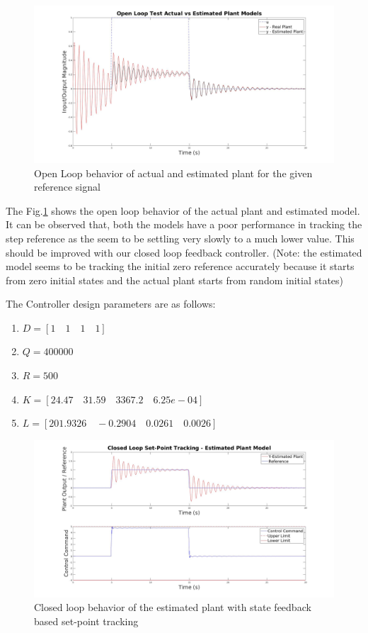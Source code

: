 \documentclass[11pt,usenames]{article}
\begin{document}
\begin{figure}[htpb]
	\centering
	\includegraphics[width=0.85\columnwidth]{OpenLoop_PlantTF.jpg}
	\caption{Open Loop behavior of actual and estimated plant for the given reference signal}
	\label{fig:OpenLoop_PlantTF}
\end{figure}

The Fig.\ref{fig:OpenLoop_PlantTF} shows the open loop behavior of the actual plant and estimated model. It can be observed that, both the models have a poor performance in tracking the step reference as the seem to be settling very slowly to a much lower value. This should be improved with our closed loop feedback controller. (Note: the estimated model seems to be tracking the initial zero reference accurately because it starts from zero initial states and the actual plant starts from random initial states)



The Controller design parameters are as follows:

\begin{enumerate}
	\item $D = \left[ 1 \quad1\quad 1\quad 1\right] $
	\item $Q = 400000$
	\item $R = 500$
	\item $K = \left[24.47 \quad31.59 \quad3367.2 \quad6.25e-04\right]$	
	\item $L = \left[201.9326 \quad-0.2904 \quad0.0261 \quad0.0026\right] $
\end{enumerate}

\begin{figure}[htpb]
	\centering
	\includegraphics[width=0.85\columnwidth]{ClosedLoop_Design_OutputRef.jpg}
	\caption{Closed loop behavior of the estimated plant with state feedback based set-point tracking}
	\label{fig:ClosedLoop_Design_OutputRef}
\end{figure}
\end{document}
